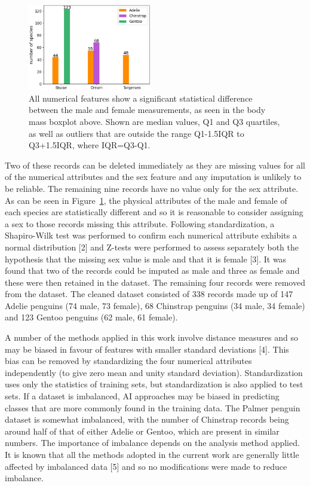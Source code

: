 \documentclass[12pt]{article}
\begin{document}
\begin{figure} %
  \centering
  \includegraphics[width=0.48\textwidth]{islands.png} %
  \caption{All numerical features show a significant statistical difference between the male and female measurements, as seen in the body mass boxplot above. Shown are median values, Q1 and Q3 quartiles, as well as outliers that are outside the range Q1-1.5IQR to Q3+1.5IQR, where IQR=Q3-Q1.}
  \label{fig:islands}
\end{figure}   

Two of these records can be deleted immediately as they are missing values for all of the numerical attributes and the sex feature and any imputation is unlikely to be reliable. The remaining nine records have no value only for the sex attribute. As can be seen in Figure~\ref{fig:islands}, the physical attributes of the male and female of each species are statistically different and so it is reasonable to consider assigning a sex to those records missing this attribute. Following standardization, a Shapiro-Wilk test was performed to confirm each numerical attribute exhibits a normal distribution [2] and Z-tests were performed to assess separately both the hypothesis that the missing sex value is male and that it is female [3]. It was found that two of the records could be imputed as male and three as female and these were then retained in the dataset. The remaining four records were removed from the dataset. The cleaned dataset consisted of 338 records made up of 147 Adelie penguins (74 male, 73 female), 68 Chinstrap penguins (34 male, 34 female) and 123 Gentoo penguins (62 male, 61 female).

A number of the methods applied in this work involve distance measures and so may be biased in favour of features with smaller standard deviations [4]. This bias can be removed by standardizing the four numerical attributes independently (to give zero mean and unity standard deviation). Standardization uses only the statistics of training sets, but standardization is also applied to test sets. If a dataset is imbalanced, AI approaches may be biased in predicting classes that are more commonly found in the training data. The Palmer penguin dataset is somewhat imbalanced, with the number of Chinstrap records being around half of that of either Adelie or Gentoo, which are present in similar numbers. The importance of imbalance depends on the analysis method applied. It is known that all the methods adopted in the current work are generally little affected by imbalanced data [5] and so no modifications were made to reduce imbalance.
\end{document}
